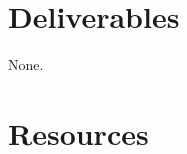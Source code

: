 \section{Deliverables}
None.

\section{Resources}
\renewcommand{\addcontentsline}[3]{} %



\begin{comment}
\section{Distortion control}
We do not provide any accurate distortion control algorithm. Our
compressor is able to control the number of gray tones in the
reconstructed image, using a deadzone scalar quantizer. The
quantization steps are selected simulating a
\href{https://en.wikipedia.org/wiki/Bit_plane}{bit-plane}
encoding. Therefore, for 8-bit images, the quantization steps are
$\Delta\in\{128, 64, 32, 16, 8, 4, 2, 1\}$ (powers of $2$). Notice
that we cannot control the distortion in terms of the RMSE, for
example.

\section{Rate control}
The bit-rate (the number of bits/pixel) obtained after using
scalar quantization quantization and PNG depends on:
\begin{enumerate}
\item The number of output indexes generated by the quantizer.
\item The capability of PNG for removing spatial/statistical
  redudancy, aspect that we cannot control with accuracy (only some
  levels of compression are usually available).
\item In the case of SQ, the quantization step size $\Delta$
  used. Notice that, usually, the higher the $\Delta$, the higher the
  compression ratio, the lower the number of bits/pixel, and the lower
  the quality of the reconstructed image.
\end{enumerate}

Therefore, variying $\Delta$ we should be able to generate a Rate/Distortion (RD)
curve~\cite{vruiz__information_theory}, where the $x$-axis represents the bit-rate (in bit/pixel, for
example) and the $y$-axis represents the distortion (the
\href{https://en.wikipedia.org/wiki/Root-mean-square_deviation}{Root
  Mean Square Error (RMSE)}, for example). However, notice that only seven RD points will be available\footnote{This is a direct consequence of using bit-plane encoding.}, and the rate of each point is not controllable.\footnote{Because we cannot control the bit-rate with PNG.}
\end{comment}
